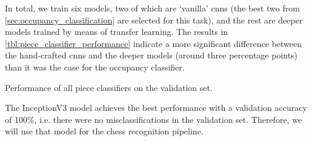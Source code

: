 \documentclass[../main.tex]{subfiles}
\begin{document}
In total, we train six models, two of which are `vanilla' \glspl{cnn} (the best two from \cref{sec:occupancy_classification} are selected for this task), and the rest are deeper models trained by means of transfer learning.
The results in \cref{tbl:piece_classifier_performance} indicate a more significant difference between the hand-crafted \glspl{cnn} and the deeper models (around three percentage points) than it was the case for the occupancy classifier.
\begin{table}
    \centering
    \caption[Performance of all piece classifiers on the validation set.]{
        Performance of all piece classifiers on the validation set.
    }
    \label{tbl:piece_classifier_performance}
\end{table}
The InceptionV3 model achieves the best performance with a validation accuracy of 100\%, i.e. there were no misclassifications in the validation set.
Therefore, we will use that model for the chess recognition pipeline.
\end{document}
